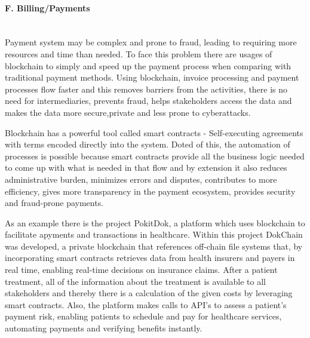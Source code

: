 \paragraph{F. Billing/Payments} \mbox{}\\
Payment system may be complex and prone to fraud, leading to requiring more resources and time than needed. To face this problem there are usages of blockchain to simply and speed up the payment process when comparing with traditional payment methods. Using blockchain, invoice processing and payment processes flow faster and this removes barriers from the activities, there is no need for intermediaries, prevents fraud, helps stakeholders access the data and makes the data more secure,private and less prone to cyberattacks. 

Blockchain has a powerful tool called smart contracts - Self-executing agreements with terms encoded directly into the system. Doted of this, the automation of processes is possible because smart contracts provide all the business logic needed to come up with what is needed in that flow and by extension it also reduces administrative burden, minimizes errors and disputes, contributes to more efficiency, gives more transparency in the payment ecosystem, provides security and fraud-prone payments.

As an example there is the project PokitDok, a platform which uses blockchain to facilitate apyments and transactions in healthcare. Within this project DokChain was developed, a private blockchain that references off-chain file systems that, by incorporating smart contracts retrieves data from health insurers and payers in real time, enabling real-time decisions on insurance claims. After a patient treatment, all of the information about the treatment is available to all stakeholders and thereby there is a calculation of the given costs by leveraging smart contracts. Also, the platform makes calls to API's to assess a patient's payment risk, enabling patients to schedule and pay for healthcare services, automating payments and verifying benefits instantly.

